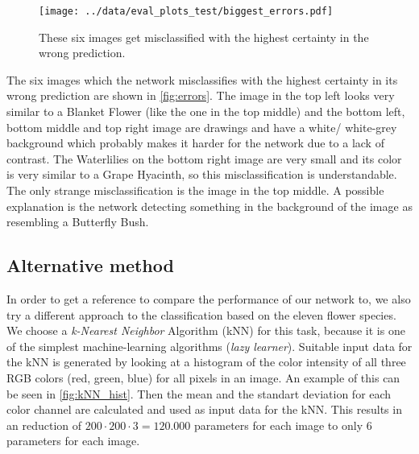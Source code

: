 \begin{wrapfigure}{R}{0.75\textwidth}
    \centering
    \texttt{[image: ../data/eval\_plots\_test/biggest\_errors.pdf]}
    \caption{These six images get misclassified with the highest certainty in the wrong prediction.}
    \label{fig:errors}
\end{wrapfigure}
The six images which the network misclassifies with the highest certainty in its wrong prediction are shown in \autoref{fig:errors}.
The image in the top left looks very similar to a Blanket Flower (like the one in the top middle) and the bottom left, bottom middle and top right image are drawings and have
a white/ white-grey background which probably makes it harder for the network due to a lack of contrast.
The Waterlilies on the bottom right image are very small and its color is very similar to a Grape Hyacinth, so this misclassification is understandable.
The only strange misclassification is the image in the top middle.
A possible explanation is the network detecting something in the background of the image as resembling a Butterfly Bush.


\subsection{Alternative method}
In order to get a reference to compare the performance of our network to, we also try a different approach to the classification based on the eleven flower species.
We choose a \textit{k-Nearest Neighbor} Algorithm (kNN) for this task, because it is one of the simplest machine-learning algorithms (\textit{lazy learner}). 
Suitable input data for the kNN is generated by looking at a histogram of the color intensity of all three RGB colors (red, green, blue) for all pixels in an image.
An example of this can be seen in \autoref{fig:kNN_hist}.
Then the mean and the standart deviation for each color channel are calculated and used as input data for the kNN.
This results in an reduction of $200\cdot 200 \cdot 3 = 120.000$ parameters for each image to only $6$ parameters for each image.

